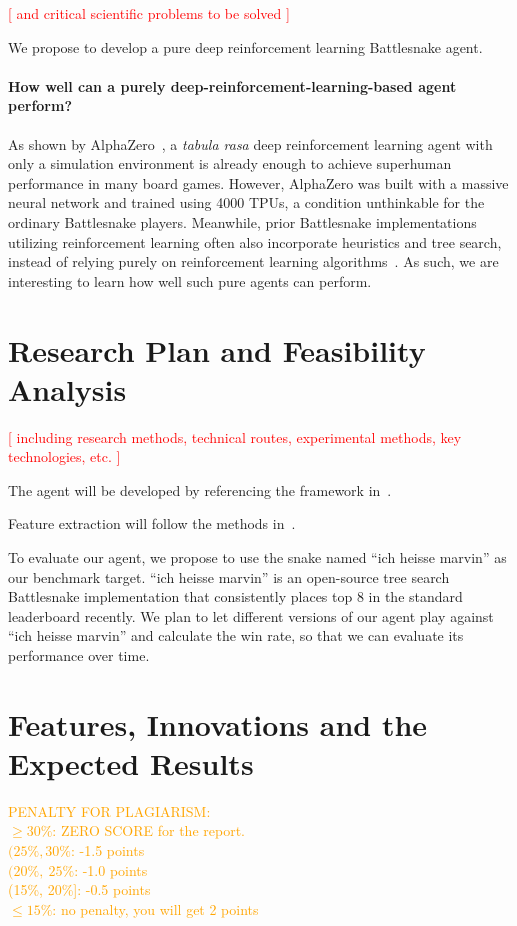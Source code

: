 \documentclass[a4paper]{article}
\newcommand{\todo}[1]{\textcolor{red}{[ #1 ]}}
\newcommand{\instruction}[1]{\textcolor{orange}{#1}}
\begin{document}
\todo{and critical scientific problems to be solved}

We propose to develop a pure deep reinforcement learning Battlesnake agent.

\paragraph{How well can a purely deep-reinforcement-learning-based agent
perform?} As shown by AlphaZero~\cite{silver2017mastering}, a \emph{tabula rasa}
deep reinforcement learning agent with only a simulation environment is already
enough to achieve superhuman performance in many board games. However,
AlphaZero was built with a massive neural network and trained using 4000 TPUs,
a condition unthinkable for the ordinary Battlesnake players. Meanwhile,
prior Battlesnake implementations utilizing reinforcement learning often also
incorporate heuristics and tree search,
instead of relying purely on reinforcement learning
algorithms~\cite{chung2020battlesnake,binnersley2020battlesnake}.
As such, we are interesting to learn how well such pure agents can perform.

\section{Research Plan and Feasibility Analysis}

\todo{including research methods, technical routes, experimental methods,
    key technologies, etc.}

The agent will be developed by referencing the framework
in~\cite{chung2020battlesnake}.

Feature extraction will follow the methods in~\cite{siddiqui2020multiagent}.

To evaluate our agent,
we propose to use the snake named ``ich heisse marvin'' as our benchmark target.
``ich heisse marvin'' is an open-source tree search Battlesnake implementation
that consistently places top 8 in the standard leaderboard recently.
We plan to let different versions of our agent play against ``ich heisse
marvin'' and calculate the win rate,
so that we can evaluate its performance over time.

\section{Features, Innovations and the Expected Results}

\instruction{
    PENALTY FOR PLAGIARISM:\\
    \(\geq 30\%\): ZERO SCORE for the report.\\
    \((25\%,30\%\): -1.5 points\\
    \((20\%,\ 25\%\): -1.0 points\\
    (15\%, 20\%]: -0.5 points\\
    \(\leq 15\%\): no penalty, you will get 2 points
}

\printbibliography
\end{document}
